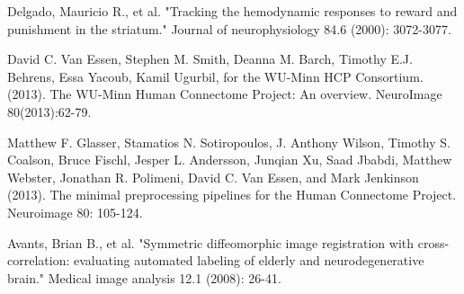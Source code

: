\documentclass[11pt]{article}
\begin{document}
\small{
Delgado, Mauricio R., et al. "Tracking the hemodynamic responses to reward and punishment in the striatum." Journal of neurophysiology 84.6 (2000): 3072-3077.

David C. Van Essen, Stephen M. Smith, Deanna M. Barch, Timothy E.J. Behrens, Essa Yacoub, Kamil Ugurbil, for the WU-Minn HCP Consortium. (2013). The WU-Minn Human Connectome Project: An overview. NeuroImage 80(2013):62-79. 

Matthew F. Glasser, Stamatios N. Sotiropoulos, J. Anthony Wilson, Timothy S. Coalson, Bruce Fischl, Jesper L. Andersson, Junqian Xu, Saad Jbabdi, Matthew Webster, Jonathan R. Polimeni, David C. Van Essen, and Mark Jenkinson (2013). 
The minimal preprocessing pipelines for the Human Connectome Project. Neuroimage 80: 105-124.

Avants, Brian B., et al. "Symmetric diffeomorphic image registration with cross-correlation: evaluating automated labeling of elderly and neurodegenerative brain." Medical image analysis 12.1 (2008): 26-41.
}
\end{document}
